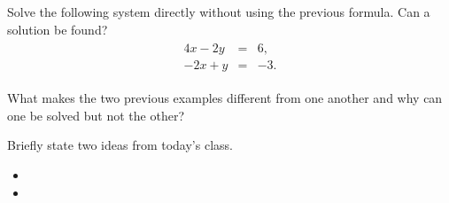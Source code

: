 \begin{problem}
\vfill
\clearpage

\item Solve the following system directly without using the previous formula. Can a solution be found?
\begin{eqnarray*}
  \begin{array}{lcl}
     4x - 2y & = & 6, \\
    -2x + y & = & -3.
  \end{array}
\end{eqnarray*}

\vfill

\item What makes the two previous examples different from one another and why can one be solved but not the other?
  \vspace{4em}


\end{problem}


\postClass

\begin{problem}
\item Briefly state two ideas from today's class.
  \begin{itemize}
  \item
  \item
  \end{itemize}
\item
  \begin{subproblem}
    \item
  \end{subproblem}
\end{problem}



